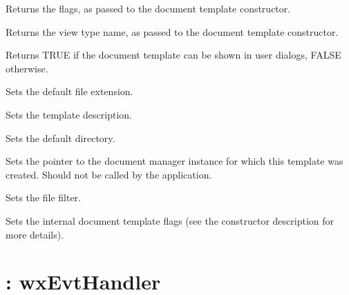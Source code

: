 

Returns the flags, as passed to the document template constructor.



Returns the view type name, as passed to the document template constructor.



Returns TRUE if the document template can be shown in user dialogs, FALSE otherwise.



Sets the default file extension.



Sets the template description.



Sets the default directory.



Sets the pointer to the document manager instance for which this template was created.
Should not be called by the application.



Sets the file filter.



Sets the internal document template flags (see the constructor description for more details).

\section{: wxEvtHandler}\label{wxdocument}


